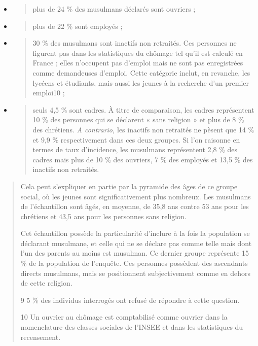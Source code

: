 \begin{itemize}
\item
  \begin{quote}
  plus de 24 \% des musulmans déclarés sont ouvriers ;
  \end{quote}
\item
  \begin{quote}
  plus de 22 \% sont employés ;
  \end{quote}
\item
  \begin{quote}
  30 \% des musulmans sont inactifs non retraités. Ces personnes ne
  figurent pas dans les statistiques du chômage tel qu'il est calculé en
  France ; elles n'occupent pas d'emploi mais ne sont pas enregistrées
  comme demandeuses d'emploi. Cette catégorie inclut, en revanche, les
  lycéens et étudiants, mais aussi les jeunes à la recherche d'un
  premier emploi10 ;
  \end{quote}
\item
  \begin{quote}
  seuls 4,5 \% sont cadres. À titre de comparaison, les cadres
  représentent 10 \% des personnes qui se déclarent « sans religion » et
  plus de 8 \% des chrétiens. \emph{A contrario,} les inactifs non
  retraités ne pèsent que 14 \% et 9,9 \% respectivement dans ces deux
  groupes. Si l'on raisonne en termes de taux d'incidence, les musulmans
  représentent 2,8 \% des cadres mais plus de 10 \% des ouvriers, 7 \%
  des employés et 13,5 \% des inactifs non retraités.
  \end{quote}
\end{itemize}

\begin{quote}
Cela peut s'expliquer en partie par la pyramide des âges de ce groupe
social, où les jeunes sont significativement plus nombreux. Les
musulmans de l'échantillon sont âgés, en moyenne, de 35,8 ans contre 53
ans pour les chrétiens et 43,5 ans pour les personnes sans religion.

Cet échantillon possède la particularité d'inclure à la fois la
population se déclarant musulmane, et celle qui ne se déclare pas comme
telle mais dont l'un des parents au moins est musulman. Ce dernier
groupe représente 15 \% de la population de l'enquête. Ces personnes
possèdent des ascendants directs musulmans, mais se positionnent
subjectivement comme en dehors de cette religion.

9 5 \% des individus interrogés ont refusé de répondre à cette question.

10 Un ouvrier au chômage est comptabilisé comme ouvrier dans la
nomenclature des classes sociales de l'INSEE et dans les statistiques du
recensement.
\end{quote}

